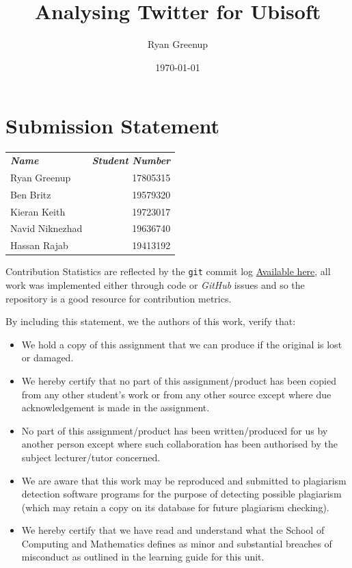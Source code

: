 \documentclass[11pt]{article}
\author{Ryan Greenup}
\date{\today}
\title{Analysing Twitter for Ubisoft}
\begin{document}
\maketitle
\tableofcontents



\section{Submission Statement}
\label{sec:org5ea9643}

\begin{center}
\begin{tabular}{lr}
\textbf{\emph{Name}} & \textbf{\emph{Student Number}}\\
Ryan Greenup & 17805315\\
Ben Britz & 19579320\\
Kieran Keith & 19723017\\
Navid Niknezhad & 19636740\\
Hassan Rajab & 19413192\\
\end{tabular}
\end{center}

Contribution Statistics are reflected by the \texttt{git} commit log \href{https://github.com/RyanGreenup/SWA-Project/commits/master}{Available here},
all work was implemented either through code or \emph{GitHub} issues and so the
repository is a good resource for contribution metrics.

By including this statement, we the authors of this work, verify that:

\begin{itemize}
\item We hold a copy of this assignment that we can produce if the original is lost or damaged.
\item We hereby certify that no part of this assignment/product has been copied from
any other student's work or from any other source except where due
acknowledgement is made in the assignment.
\item No part of this assignment/product has been written/produced for us by another
person except where such collaboration has been authorised by the subject
lecturer/tutor concerned.
\item We are aware that this work may be reproduced and submitted to plagiarism
detection software programs for the purpose of detecting possible plagiarism
(which may retain a copy on its database for future plagiarism checking).
\item We hereby certify that we have read and understand what the School of
Computing and Mathematics defines as minor and substantial breaches of
misconduct as outlined in the learning guide for this unit.
\end{itemize}
\end{document}
